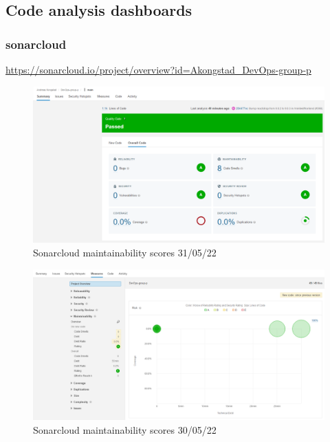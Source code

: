 \subsection{Code analysis dashboards}
\label{app:codeAnal}

\subsubsection{sonarcloud}
\label{app:codeAnalSonar}
\href{https://sonarcloud.io/project/overview?id=Akongstad_DevOps-group-p}{https://sonarcloud.io/project/overview?id=Akongstad\_DevOps-group-p}

\begin {figure}[H]
    \centering
    \includegraphics[scale=0.42]{images/analysis_tools/Sonar cloud backend.PNG}
    \caption{Sonarcloud maintainability scores 31/05/22}
    \label{fig:cloudMaintainability}
\end{figure}

\begin {figure}[H]
    \centering
    \includegraphics[scale=0.37]{images/analysis_tools/analys debt.PNG}
    \caption{Sonarcloud maintainability scores 30/05/22}
    \label{fig:cloudMaintainability}
\end{figure}

